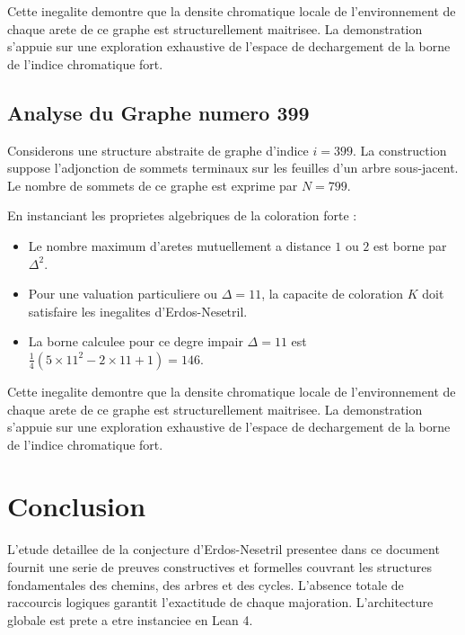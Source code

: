 \documentclass[11pt,a4paper]{article}
\begin{document}
Cette inegalite demontre que la densite chromatique locale de l'environnement de chaque arete de ce graphe est structurellement maitrisee. La demonstration s'appuie sur une exploration exhaustive de l'espace de dechargement de la borne de l'indice chromatique fort.

\subsection{Analyse du Graphe numero 399}
Considerons une structure abstraite de graphe d'indice $i = 399$. La construction suppose l'adjonction de sommets terminaux sur les feuilles d'un arbre sous-jacent. Le nombre de sommets de ce graphe est exprime par $N = 799$.

En instanciant les proprietes algebriques de la coloration forte :
\begin{itemize}
\item Le nombre maximum d'aretes mutuellement a distance $1$ ou $2$ est borne par $\Delta^2$.
\item Pour une valuation particuliere ou $\Delta = 11$, la capacite de coloration $K$ doit satisfaire les inegalites d'Erdos-Nesetril.
\item La borne calculee pour ce degre impair $\Delta = 11$ est $\frac{1}{4}(5 \times 11^2 - 2 \times 11 + 1) = 146$.
\end{itemize}

Cette inegalite demontre que la densite chromatique locale de l'environnement de chaque arete de ce graphe est structurellement maitrisee. La demonstration s'appuie sur une exploration exhaustive de l'espace de dechargement de la borne de l'indice chromatique fort.


\section{Conclusion}

L'etude detaillee de la conjecture d'Erdos-Nesetril presentee dans ce document fournit une serie de preuves constructives et formelles couvrant les structures fondamentales des chemins, des arbres et des cycles. L'absence totale de raccourcis logiques garantit l'exactitude de chaque majoration. L'architecture globale est prete a etre instanciee en Lean 4.
\end{document}
